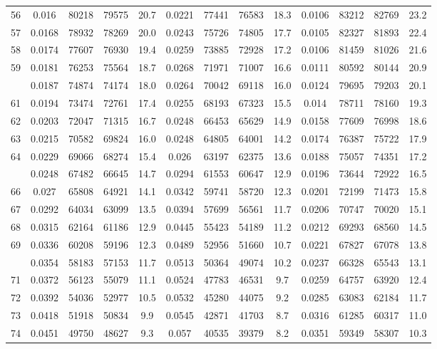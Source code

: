 \documentclass[
  14pt,
]{article}
\begin{document}
\begin{longtable}[t]{lcccccccccccc}
56 & 0.016 & 80218 & 79575 & 20.7 & 0.0221 & 77441 & 76583 & 18.3 & 0.0106 & 83212 & 82769 & 23.2\\
57 & 0.0168 & 78932 & 78269 & 20.0 & 0.0243 & 75726 & 74805 & 17.7 & 0.0105 & 82327 & 81893 & 22.4\\
58 & 0.0174 & 77607 & 76930 & 19.4 & 0.0259 & 73885 & 72928 & 17.2 & 0.0106 & 81459 & 81026 & 21.6\\
59 & 0.0181 & 76253 & 75564 & 18.7 & 0.0268 & 71971 & 71007 & 16.6 & 0.0111 & 80592 & 80144 & 20.9\\
\addlinespace
60 & 0.0187 & 74874 & 74174 & 18.0 & 0.0264 & 70042 & 69118 & 16.0 & 0.0124 & 79695 & 79203 & 20.1\\
61 & 0.0194 & 73474 & 72761 & 17.4 & 0.0255 & 68193 & 67323 & 15.5 & 0.014 & 78711 & 78160 & 19.3\\
62 & 0.0203 & 72047 & 71315 & 16.7 & 0.0248 & 66453 & 65629 & 14.9 & 0.0158 & 77609 & 76998 & 18.6\\
63 & 0.0215 & 70582 & 69824 & 16.0 & 0.0248 & 64805 & 64001 & 14.2 & 0.0174 & 76387 & 75722 & 17.9\\
64 & 0.0229 & 69066 & 68274 & 15.4 & 0.026 & 63197 & 62375 & 13.6 & 0.0188 & 75057 & 74351 & 17.2\\
\addlinespace
65 & 0.0248 & 67482 & 66645 & 14.7 & 0.0294 & 61553 & 60647 & 12.9 & 0.0196 & 73644 & 72922 & 16.5\\
66 & 0.027 & 65808 & 64921 & 14.1 & 0.0342 & 59741 & 58720 & 12.3 & 0.0201 & 72199 & 71473 & 15.8\\
67 & 0.0292 & 64034 & 63099 & 13.5 & 0.0394 & 57699 & 56561 & 11.7 & 0.0206 & 70747 & 70020 & 15.1\\
68 & 0.0315 & 62164 & 61186 & 12.9 & 0.0445 & 55423 & 54189 & 11.2 & 0.0212 & 69293 & 68560 & 14.5\\
69 & 0.0336 & 60208 & 59196 & 12.3 & 0.0489 & 52956 & 51660 & 10.7 & 0.0221 & 67827 & 67078 & 13.8\\
\addlinespace
70 & 0.0354 & 58183 & 57153 & 11.7 & 0.0513 & 50364 & 49074 & 10.2 & 0.0237 & 66328 & 65543 & 13.1\\
71 & 0.0372 & 56123 & 55079 & 11.1 & 0.0524 & 47783 & 46531 & 9.7 & 0.0259 & 64757 & 63920 & 12.4\\
72 & 0.0392 & 54036 & 52977 & 10.5 & 0.0532 & 45280 & 44075 & 9.2 & 0.0285 & 63083 & 62184 & 11.7\\
73 & 0.0418 & 51918 & 50834 & 9.9 & 0.0545 & 42871 & 41703 & 8.7 & 0.0316 & 61285 & 60317 & 11.0\\
74 & 0.0451 & 49750 & 48627 & 9.3 & 0.057 & 40535 & 39379 & 8.2 & 0.0351 & 59349 & 58307 & 10.3\\

\end{longtable}
\end{document}
